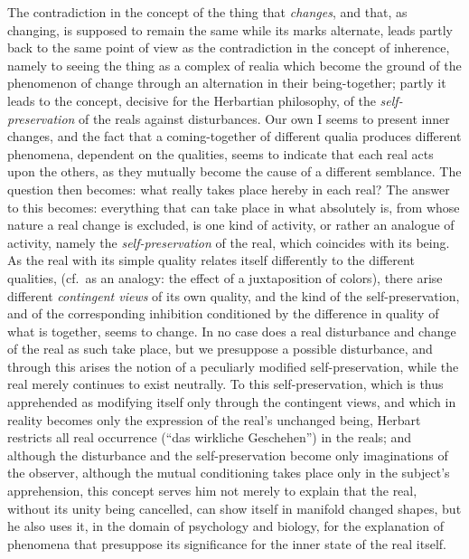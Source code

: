 The contradiction in the concept of the thing that \emph{changes}, and
that, as changing, is supposed to remain the same while its marks
alternate, leads partly back to the same point of view as the
contradiction in the concept of inherence, namely to seeing the thing as
a complex of realia which become the ground of the phenomenon of change
through an alternation in their being-together; partly it leads to the
concept, decisive for the Herbartian philosophy, of the
\emph{self-preservation} of the reals against disturbances. Our own I
seems to present inner changes, and the fact that a coming-together of
different qualia produces different phenomena, dependent on the
qualities, seems to indicate that each real acts upon the others, as they
mutually become the cause of a different semblance. The question then
becomes: what really takes place hereby in each real? The
answer to this becomes: everything that can take place in what absolutely
is, from whose nature a real change is excluded, is one kind of activity,
or rather an analogue of activity, namely the \emph{self-preservation} of
the real, which coincides with its being. As the real with its simple
quality relates itself differently to the different qualities, (cf.\ as
an analogy: the effect of a juxtaposition of colors), there arise
different \emph{contingent views} of its own quality, and the kind of the
self-preservation, and of the corresponding inhibition conditioned by the
difference in quality of what is together, seems to change. In no case
does a real disturbance and change of the real as such take place, but we
presuppose a possible disturbance, and through this arises the notion of
a peculiarly modified self-preservation, while the real merely continues
to exist neutrally. To this self-preservation, which is thus apprehended
as modifying itself only through the contingent views, and which in
reality becomes only the expression of the real's unchanged being,
Herbart restricts all real occurrence (``das wirkliche Geschehen'') in
the reals; and although the disturbance and the self-preservation become
only imaginations of the observer, although the mutual conditioning takes
place only in the subject's apprehension, this concept serves him not
merely to explain that the real, without its unity being cancelled, can
show itself in manifold changed shapes, but he also uses it, in the
domain of psychology and biology, for the explanation of phenomena that
presuppose its significance for the inner state of the real itself.

